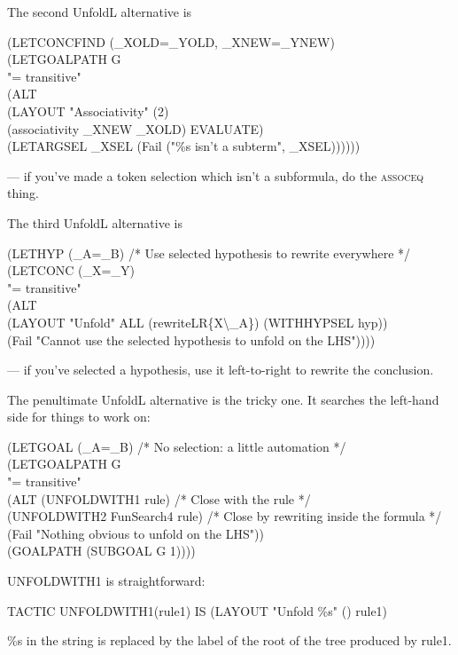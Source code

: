 The second UnfoldL alternative is 
\begin{japeish}
(LETCONCFIND (\_XOLD=\_YOLD, \_XNEW=\_YNEW) \\
\tab (LETGOALPATH G \\
\tab \tab "= transitive"  \\
\tab \tab (ALT  \\
\tab \tab \tab (LAYOUT "Associativity" (2) \\
\tab \tab \tab \tab (associativity \_XNEW \_XOLD) EVALUATE) \\
\tab \tab \tab (LETARGSEL \_XSEL (Fail ("\%s isn't a subterm", \_XSEL))))))
\end{japeish}
--- if you've made a token selection which isn't a subformula, do the \textsc{assoceq} thing.

The third UnfoldL alternative is 
\begin{japeish}
(LETHYP (\_A=\_B)  /* Use selected hypothesis to rewrite everywhere */ \\
\tab (LETCONC (\_X=\_Y) \\
\tab \tab "= transitive"  \\
\tab \tab (ALT \\
\tab \tab \tab (LAYOUT "Unfold" ALL (rewriteLR\{X{\textbackslash}\_A\}) (WITHHYPSEL hyp)) \\
\tab \tab \tab (Fail "Cannot use the selected hypothesis to unfold on the LHS"))))
\end{japeish}
--- if you've selected a hypothesis, use it left-to-right to rewrite the conclusion.

The penultimate UnfoldL alternative is the tricky one. It searches the left-hand side for things to work on:
\begin{japeish}
(LETGOAL (\_A=\_B)                      /* No selection: a little automation */ \\
\tab (LETGOALPATH G \\
\tab \tab "= transitive" \\
\tab (ALT (UNFOLDWITH1 rule)             /* Close with the rule */ \\
\tab \tab (UNFOLDWITH2 FunSearch4 rule)  /* Close by rewriting inside the formula */ \\
\tab \tab (Fail "Nothing obvious to unfold on the LHS")) \\
\tab (GOALPATH (SUBGOAL G 1)))) \\
\end{japeish}
UNFOLDWITH1 is straightforward:
\begin{japeish}
TACTIC UNFOLDWITH1(rule1) IS (LAYOUT "Unfold \%s" () rule1) 
\end{japeish}
\%s in the string is replaced by the label of the root of the tree produced by rule1.

